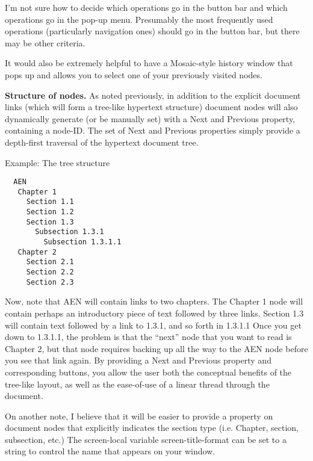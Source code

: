 \begin{itemizenoindent}
\begin{itemize}
  \end{itemize}

  I'm not sure how to decide which operations go in the button bar and
  which operations go in the pop-up menu.  Presumably the most frequently
  used operations (particularly navigation ones) should go in the button
  bar, but there may be other criteria.

  It would also be extremely helpful to have a Mosaic-style history window
  that pops up and allows you to select one of your previously visited
  nodes.
  
\item {\bf Structure of nodes.} As noted previously, in addition to the
  explicit document links (which will form a tree-like hypertext structure)
  document nodes will also dynamically generate (or be manually set) with a
  Next and Previous property, containing a node-ID.  The set of Next and
  Previous properties simply provide a depth-first traversal of the hypertext
  document tree.

  Example: The tree structure
  \begin{verbatim}
  AEN
   Chapter 1
     Section 1.1
     Section 1.2
     Section 1.3
       Subsection 1.3.1
         Subsection 1.3.1.1
   Chapter 2
     Section 2.1
     Section 2.2
     Section 2.3
  \end{verbatim}
     
     Now, note that AEN will contain links to two chapters.  The
     Chapter 1 node will contain perhaps an introductory piece of text
     followed by three links.  Section 1.3 will contain text followed
     by a link to 1.3.1, and so forth in 1.3.1.1 Once you get down to
     1.3.1.1, the problem is that the ``next'' node that you want to
     read is Chapter 2, but that node requires backing up all the way to
     the AEN node before you see that link again.  By providing a Next and
     Previous property and corresponding buttons, you allow the user both
     the conceptual benefits of the tree-like layout, as well as the
     ease-of-use of a linear thread through the document. 
     
     On another note, I believe that it will be easier to provide a property on
     document nodes that explicitly indicates the section type (i.e. Chapter,
     section, subsection, etc.)  The screen-local variable
     screen-title-format can be set to a string to control the name that
     appears on your window.

\end{itemizenoindent}
